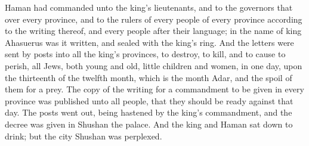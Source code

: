 {Haman had
commanded unto the
king’s
lieutenants, and to the
governors that
{} over every
province, and to the
rulers of every
people of every
province according to the
writing thereof, and
{} every
people after their
language; in the
name of
king
Ahasuerus was it
written, and
sealed with the
king’s
ring.
And the
letters were
sent
by
posts into all the
king’s
provinces, to
destroy, to
kill, and to cause to
perish, all
Jews, both
young and
old, little
children and
women, in
one
day,
{} upon the
thirteenth
{} of the
twelfth
month, which is the
month
Adar, and
{} the
spoil of them for a
prey.
The
copy of the
writing for a
commandment to be
given in every
province was
published unto all
people, that they should be
ready against that
day.
The
posts went
out, being
hastened by the
king’s
commandment, and the
decree was
given in
Shushan the
palace. And the
king and
Haman sat
down to
drink; but the
city
Shushan was
perplexed.

}
